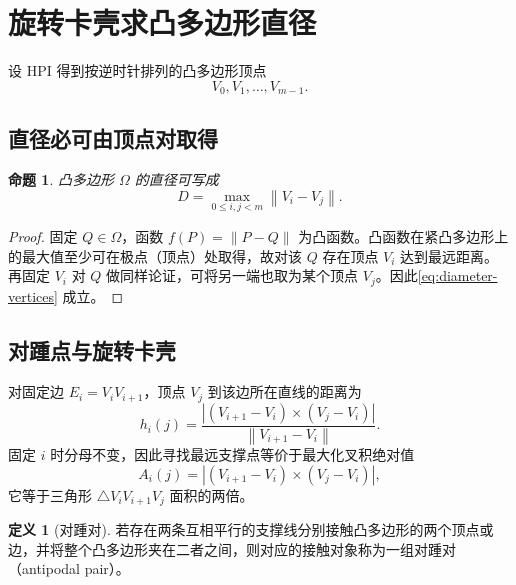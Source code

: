\documentclass[UTF8,12pt,a4paper]{ctexart}
\newtheorem{proposition}[theorem]{命题}
\theoremstyle{definition}
\newtheorem{definition}[theorem]{定义}
\newcommand{\norm}[1]{\left\lVert #1\right\rVert}
\newcommand{\abs}[1]{\left\lvert #1\right\rvert}
\newcommand{\cross}{\mathbin{\times}}
\begin{document}
\section{旋转卡壳求凸多边形直径}

设 HPI 得到按逆时针排列的凸多边形顶点
\[
V_0,V_1,\ldots,V_{m-1}.
\]

\subsection{直径必可由顶点对取得}

\begin{proposition}
凸多边形 $\Omega$ 的直径可写成
\begin{equation}
D=\max_{0\le i,j<m}\norm{V_i-V_j}.
\label{eq:diameter-vertices}
\end{equation}
\end{proposition}
\begin{proof}
固定 $Q\in\Omega$，函数 $f(P)=\norm{P-Q}$ 为凸函数。凸函数在紧凸多边形上的最大值至少可在极点（顶点）处取得，故对该 $Q$ 存在顶点 $V_i$ 达到最远距离。再固定 $V_i$ 对 $Q$ 做同样论证，可将另一端也取为某个顶点 $V_j$。因此\cref{eq:diameter-vertices} 成立。
\end{proof}

\subsection{对踵点与旋转卡壳}

对固定边 $E_i=V_iV_{i+1}$，顶点 $V_j$ 到该边所在直线的距离为
\begin{equation}
h_i(j)=
\frac{
\abs{(V_{i+1}-V_i)\cross(V_j-V_i)}
}{\norm{V_{i+1}-V_i}}.
\label{eq:edge-point-distance}
\end{equation}
固定 $i$ 时分母不变，因此寻找最远支撑点等价于最大化叉积绝对值
\begin{equation}
A_i(j)=\abs{(V_{i+1}-V_i)\cross(V_j-V_i)},
\label{eq:area-objective}
\end{equation}
它等于三角形 $\triangle V_iV_{i+1}V_j$ 面积的两倍。

\begin{definition}[对踵对]
若存在两条互相平行的支撑线分别接触凸多边形的两个顶点或边，并将整个凸多边形夹在二者之间，则对应的接触对象称为一组对踵对（antipodal pair）。
\end{definition}
\end{document}
